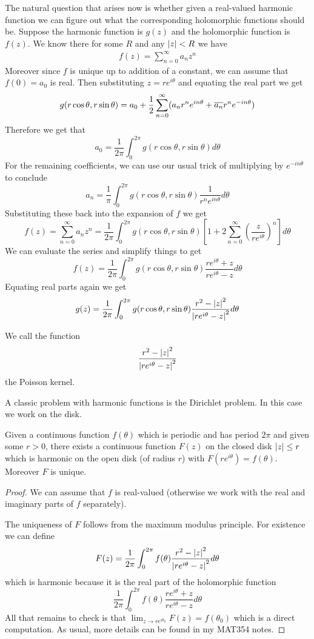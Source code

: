 The natural question that arises now is whether given a real-valued harmonic function we can figure out what the corresponding holomorphic functions should be. Suppose the harmonic function is $g(z)$ and the holomorphic function is $f(z)$. We know there for some $R$ and any $\left|z\right| < R$ we have
\begin{align*}
    f(z) = \sum_{n = 0}^\infty a_n z^n
\end{align*}
Moreover since $f$ is unique up to addition of a constant, we can assume that $f(0) = a_0$ is real. Then substituting $z = re^{i \theta}$ and equating the real part we get
$$g(r \cos \theta, r \sin \theta) = a_0 + \frac{1}{2}\sum_{n = 0}^\infty (a_n r^n e^{in \theta} + \overline{a_n} r^n e^{-in \theta})$$
Therefore we get that
$$a_0 = \frac{1}{2\pi} \int_0^{2\pi} g(r \cos \theta, r \sin \theta) d\theta$$
For the remaining coefficients, we can use our usual trick of multiplying by $e^{-in \theta}$ to conclude
$$a_n = \frac{1}{\pi} \int_0^{2\pi} g(r \cos \theta, r \sin \theta) \frac{1}{r^n e^{in \theta}} d\theta$$
Substituting these back into the expansion of $f$ we get
$$f(z) = \sum_{n = 0}^\infty a_n z^n = \frac{1}{2\pi} \int_0^{2 \pi} g(r \cos \theta, r \sin \theta) \left[ 1 + 2 \sum_{n = 0}^\infty \left( \frac{z}{re^{i \theta}} \right)^n \right] d\theta$$
We can evaluate the series and simplify things to get
$$f(z) = \frac{1}{2\pi} \int_0^{2\pi} g(r \cos \theta, r \sin \theta) \frac{re^{i \theta} + z}{re^{i \theta} - z} d\theta$$
Equating real parts again we get
$$g(z) = \frac{1}{2\pi} \int_0^{2\pi} g(r \cos \theta, r \sin \theta) \frac{r^2 - \left|z\right|^2}{\left|re^{i \theta} - z\right|^2} d\theta$$
\begin{remark}
We call the function
$$\frac{r^2 - \left|z\right|^2}{\left|re^{i \theta} - z\right|^2}$$
the Poisson kernel.
\end{remark}

A classic problem with harmonic functions is the Dirichlet problem. In this case we work on the disk. 
\begin{theorem}
    Given a continuous function $f(\theta)$ which is periodic and has period $2\pi$ and given some $r > 0$, there exists a continuous function $F(z)$ on the closed disk $\left|z\right| \leq r$ which is harmonic on the open disk (of radius $r$) with $F(re^{i \theta}) = f(\theta)$. Moreover $F$ is unique.
\end{theorem}
\begin{proof}
    We can assume that $f$ is real-valued (otherwise we work with the real and imaginary parts of $f$ separately).

    The uniqueness of $F$ follows from the maximum modulus principle. For existence we can define
    $$F(z) = \frac{1}{2\pi} \int_0^{2\pi} f(\theta) \frac{r^2 - \left|z\right|^2}{\left|re^{i \theta} - z\right|^2} d\theta$$
    which is harmonic because it is the real part of the holomorphic function
    $$ \frac{1}{2\pi} \int_0^{2\pi} f(\theta) \frac{re^{i \theta} + z}{re^{i \theta} - z} d\theta $$
    All that remains to check is that $\lim_{z \to re^{i \theta_0}} F(z) = f(\theta_0)$ which is a direct computation. As usual, more details can be found in my MAT354 notes.
\end{proof}

